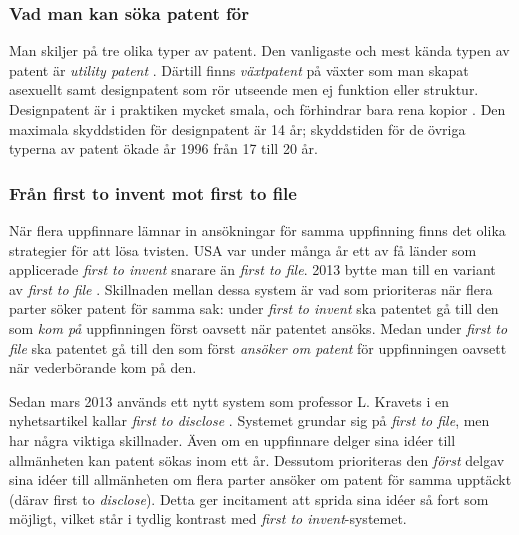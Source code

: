 \subsubsection{Vad man kan söka patent för}

Man skiljer på tre olika typer av patent. Den vanligaste och mest kända typen av patent är \emph{utility patent} \cite{cmu-overview}.
Därtill finns \emph{växtpatent} på växter som man skapat asexuellt samt designpatent som rör utseende men ej funktion eller struktur. Designpatent är i praktiken mycket smala, och förhindrar bara rena kopior . Den maximala skyddstiden för designpatent är 14 år; skyddstiden för de övriga typerna av patent ökade år 1996 från 17 till 20 år.


\subsubsection{Från first to invent mot first to file} 

När flera uppfinnare lämnar in ansökningar för samma uppfinning finns det olika strategier för att lösa tvisten. USA var under många år ett av få länder som applicerade \emph{first to invent} snarare än \emph{first to file}. 2013 bytte man till en variant av \emph{first to file} \cite{leahy}.%
 Skillnaden mellan dessa system är vad som prioriteras när flera parter söker patent för samma sak: under \emph{first to invent} ska patentet gå till den som \emph{kom på} uppfinningen först oavsett när patentet ansöks. Medan under \emph{first to file} ska patentet gå till den som först \emph{ansöker om patent} för uppfinningen oavsett när vederbörande kom på den. 

Sedan mars 2013 används ett nytt system som professor L. Kravets i en nyhetsartikel kallar \emph{first to disclose} \cite{kravets}. Systemet grundar sig på \emph{first to file}, men har några viktiga skillnader. Även om en uppfinnare delger sina idéer till allmänheten kan patent sökas inom ett år. Dessutom prioriteras den \emph{först} delgav sina idéer till allmänheten om flera parter ansöker om patent för samma upptäckt (därav first to \emph{disclose}). Detta ger incitament att sprida sina idéer så fort som möjligt, vilket står i tydlig kontrast med \emph{first to invent}-systemet.

